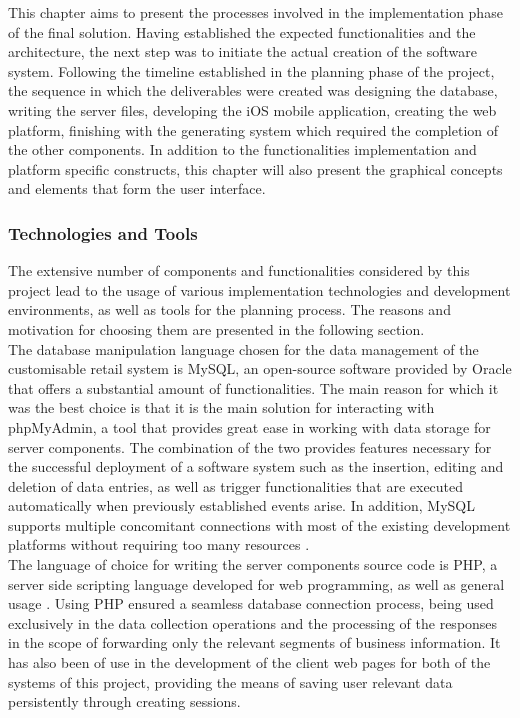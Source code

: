 This chapter aims to present the processes involved in the implementation phase of the final solution. Having established the expected functionalities and the architecture, the next step was to initiate the actual creation of the software system. Following the timeline established in the planning phase of the project, the sequence in which the deliverables were created was designing the database, writing the server files, developing the iOS mobile application, creating the web platform, finishing with the generating system which required the completion of the other components. In addition to the functionalities implementation and platform specific constructs, this chapter will also present the graphical concepts and elements that form the user interface.

\subsubsection{Technologies and Tools}

The extensive number of components and functionalities considered by this project lead to the usage of various implementation technologies and development environments, as well as tools for the planning process. The reasons and motivation for choosing them are presented in the following section.\\

The database manipulation language chosen for the data management of the customisable retail system is MySQL, an open-source software provided by Oracle that offers a substantial amount of functionalities. The main reason for which it was the best choice is that it is the main solution for interacting with phpMyAdmin, a tool that provides great ease in working with data storage for server components. The combination of the two provides features necessary for the successful deployment of a software system such as the insertion, editing and deletion of data entries, as well as trigger functionalities that are executed automatically when previously established events arise. In addition, MySQL supports multiple concomitant connections with most of the existing development platforms without requiring too many resources \cite{schifreen_2010}.\\

The language of choice for writing the server components source code is PHP, a server side scripting language developed for web programming, as well as general usage \cite{runceanu_2014}. Using PHP ensured a seamless database connection process, being used exclusively in the data collection operations and the processing of the responses in the scope of forwarding only the relevant segments of business information. It has also been of use in the development of the client web pages for both of the systems of this project, providing the means of saving user relevant data persistently through creating sessions.\\

